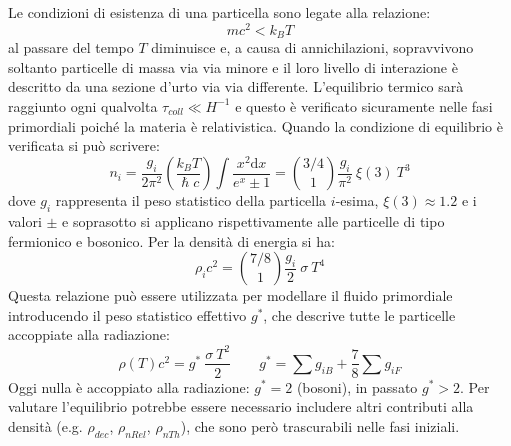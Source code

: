 Le condizioni di esistenza di una particella sono legate alla relazione:
$$
mc^2 < k_B T
$$
al passare del tempo $T$ diminuisce e, a causa di annichilazioni, sopravvivono soltanto particelle di massa via via minore e il loro livello di interazione è descritto da una sezione d'urto via via differente. L'equilibrio termico sarà raggiunto ogni qualvolta $\tau_{coll}\ll H^{-1}$ e questo è verificato sicuramente nelle fasi primordiali poiché la materia è relativistica. Quando la condizione di equilibrio è verificata si può scrivere:
\begin{equation}
    n_i = \frac{g_i}{2\pi^2}\left ( \frac{k_B T}{\hslash c} \right )\int \frac{x^2 \mathrm{d}x}{e^x \pm 1} = \binom{3/4}{1} \frac{g_i}{\pi^2}~\xi (3)~T^3
\end{equation}
dove $g_i$ rappresenta il peso statistico della particella $i$-esima, $\xi (3) \approx 1.2$ e i valori $\pm$ e soprasotto si applicano rispettivamente alle particelle di tipo fermionico e bosonico. Per la densità di energia si ha:
\begin{equation}
    \rho_i c^2= \binom{7/8}{1} \frac{g_i}{2}~\sigma ~T^4
\end{equation}
Questa relazione può essere utilizzata per modellare il fluido primordiale introducendo il peso statistico effettivo $g^*$, che descrive tutte le particelle accoppiate alla radiazione:
\begin{equation}
    \rho(T)c^2 = g^* ~ \frac{\sigma ~ T^2}{2} \qquad g^* = \sum g_{iB} + \frac{7}{8} \sum g_{iF} \label{eq:statisticweight}
\end{equation}
Oggi nulla è accoppiato alla radiazione: $g^*=2$ (bosoni), in passato $g^*>2$. Per valutare l'equilibrio potrebbe essere necessario includere altri contributi alla densità (e.g. $\rho_{dec}$, $\rho_{nRel}$, $\rho_{nTh}$), che sono però trascurabili nelle fasi iniziali.